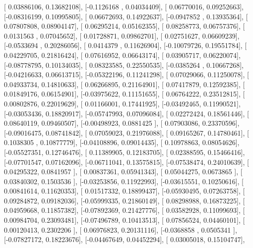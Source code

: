 \documentclass{article}
\begin{document}
       [ 0.03886106,  0.13682108],
       [-0.1126168 ,  0.04034409],
       [ 0.06770016,  0.09252663],
       [-0.08316199,  0.10995805],
       [ 0.06672693,  0.14922637],
       [-0.0947852 ,  0.13935364],
       [ 0.07807808,  0.08904147],
       [ 0.06295214,  0.05162355],
       [ 0.08258773,  0.06757376],
       [ 0.0131563 ,  0.07045652],
       [ 0.01728871,  0.09862701],
       [ 0.02751627,  0.06609239],
       [-0.0533694 ,  0.20286056],
       [ 0.0414379 ,  0.11626904],
       [-0.10079726,  0.19551784],
       [ 0.04229705,  0.21816424],
       [ 0.07616952,  0.06643174],
       [ 0.03905717,  0.06220074],
       [-0.08778795,  0.10134035],
       [ 0.08323585,  0.22550535],
       [-0.0385264 ,  0.10667268],
       [-0.04216633,  0.06613715],
       [-0.05322196,  0.11241298],
       [ 0.07029066,  0.11250078],
       [ 0.04933734,  0.14810633],
       [ 0.06266895,  0.21164901],
       [ 0.07417879,  0.12592385],
       [ 0.01849176,  0.06154901],
       [-0.03975622,  0.11151655],
       [ 0.06764222,  0.23512815],
       [ 0.00802876,  0.22019629],
       [ 0.01166001,  0.17441925],
       [-0.03492465,  0.11990521],
       [-0.03053436,  0.18820917],
       [-0.05747993,  0.07096084],
       [ 0.02272424,  0.18561446],
       [ 0.08640119,  0.09460507],
       [-0.00498923,  0.0881425 ],
       [ 0.07903086,  0.23370596],
       [-0.09016475,  0.08741842],
       [ 0.07059023,  0.21976088],
       [ 0.09165267,  0.14780461],
       [ 0.1038305 ,  0.10877779],
       [-0.04108896,  0.09014435],
       [ 0.10978863,  0.08054626],
       [-0.05527351,  0.12746476],
       [ 0.11389905,  0.12183705],
       [ 0.02388595,  0.15466416],
       [-0.07701547,  0.07162096],
       [-0.06711041,  0.13575815],
       [-0.07538474,  0.24010639],
       [ 0.04295322,  0.0841957 ],
       [ 0.00837361,  0.05941343],
       [ 0.05044275,  0.0673865 ],
       [ 0.03840302,  0.1503536 ],
       [-0.03253856,  0.11922993],
       [-0.03615551,  0.10250616],
       [ 0.00841614,  0.11620353],
       [ 0.01517332,  0.18899437],
       [-0.05930495,  0.07263758],
       [ 0.09284872,  0.09182036],
       [-0.05999335,  0.21860149],
       [ 0.08298988,  0.16873225],
       [ 0.04959668,  0.11857382],
       [-0.07892369,  0.21427776],
       [ 0.03582928,  0.11099693],
       [ 0.00984704,  0.23093481],
       [-0.07496789,  0.10413513],
       [ 0.07856524,  0.04460101],
       [ 0.00120413,  0.2302206 ],
       [ 0.06976823,  0.20131116],
       [-0.0368858 ,  0.0505341 ],
       [-0.07827172,  0.18223676],
       [-0.04467649,  0.04452294],
       [ 0.03005018,  0.15104747],
\end{document}
